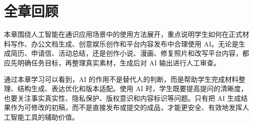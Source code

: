 \section*{全章回顾}

本章围绕人工智能在通识应用场景中的使用方法展开，重点说明学生如何在正式材料写作、办公文档生成、创意娱乐创作和平台内容发布中合理使用 AI。无论是生成简历、申请信、活动总结，还是创作小说、漫画、修复照片和改写平台内容，都应先明确任务目标，再整理真实素材，生成后对 AI 输出进行人工审查。

通过本章学习可以看到，AI 的作用不是替代人的判断，而是帮助学生完成材料整理、结构生成、表达优化和版本适配。使用 AI 时，学生既要提高提问的清晰度，也要关注事实真实性、隐私保护、版权意识和内容标识等问题。只有把 AI 生成结果作为可修改的初稿，而不是直接发布或提交的成品，才能更安全、有效地发挥人工智能工具的辅助价值。
